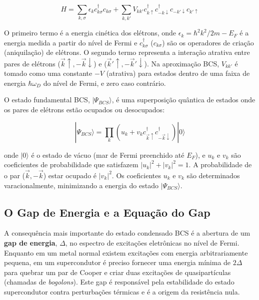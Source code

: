 \documentclass[12pt, a4paper, oneside]{report}
\begin{document}
\begin{equation}
    H = \sum_{k,\sigma} \epsilon_k c_{k\sigma}^\dagger c_{k\sigma} + \sum_{k,k'} V_{kk'} c_{k\uparrow}^\dagger c_{-k\downarrow}^\dagger c_{-k'\downarrow} c_{k'\uparrow}
\end{equation}

O primeiro termo é a energia cinética dos elétrons, onde $\epsilon_k = \hbar^2 k^2 / 2m - E_F$ é a energia medida a partir do nível de Fermi e $c_{k\sigma}^\dagger$ ($c_{k\sigma}$) são os operadores de criação (aniquilação) de elétrons. O segundo termo representa a interação atrativa entre pares de elétrons ($\vec{k}\uparrow, -\vec{k}\downarrow$) e ($\vec{k}'\uparrow, -\vec{k}'\downarrow$). Na aproximação BCS, $V_{kk'}$ é tomado como uma constante $-V$ (atrativa) para estados dentro de uma faixa de energia $\hbar \omega_D$ do nível de Fermi, e zero caso contrário.

O estado fundamental BCS, $|\Psi_{BCS}\rangle$, é uma superposição quântica de estados onde os pares de elétrons estão ocupados ou desocupados:

\begin{equation}
    |\Psi_{BCS}\rangle = \prod_k (u_k + v_k c_{\vec{k}\uparrow}^\dagger c_{-\vec{k}\downarrow}^\dagger) |0\rangle
\end{equation}

onde $|0\rangle$ é o estado de vácuo (mar de Fermi preenchido até $E_F$), e $u_k$ e $v_k$ são coeficientes de probabilidade que satisfazem $|u_k|^2 + |v_k|^2 = 1$. A probabilidade de o par ($\vec{k}, -\vec{k}$) estar ocupado é $|v_k|^2$. Os coeficientes $u_k$ e $v_k$ são determinados varacionalmente, minimizando a energia do estado $|\Psi_{BCS}\rangle$.

\subsection{O Gap de Energia e a Equação do Gap}

A consequência mais importante do estado condensado BCS é a abertura de um \textbf{gap de energia}, $\Delta$, no espectro de excitações eletrônicas no nível de Fermi. Enquanto em um metal normal existem excitações com energia arbitrariamente pequena, em um supercondutor é preciso fornecer uma energia mínima de $2\Delta$ para quebrar um par de Cooper e criar duas excitações de quasipartículas (chamadas de \textit{bogolons}). Este gap é responsável pela estabilidade do estado supercondutor contra perturbações térmicas e é a origem da resistência nula.
\end{document}

